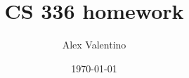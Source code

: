 \documentclass[12pt, letterpaper]{article}
\date{\today}
\author{Alex Valentino}
\title{CS 336 homework}
\begin{document}
\begin{enumerate}

\end{enumerate}
\end{document}
